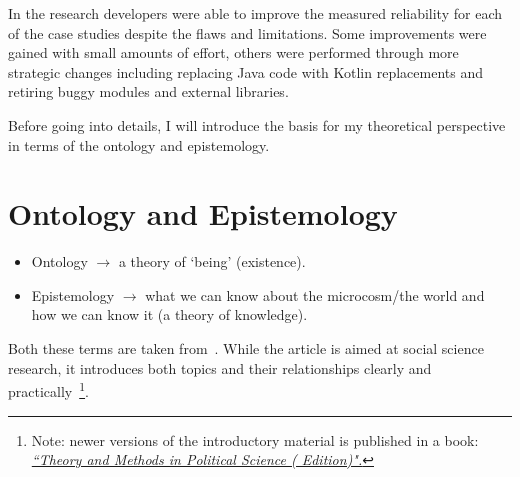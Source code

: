 In the research developers were able to improve the measured reliability for each of the case studies despite the flaws and limitations. Some improvements were gained with small amounts of effort, others were performed through more strategic changes including replacing Java code with Kotlin replacements and retiring buggy modules and external libraries.  

Before going into details, I will introduce the basis for my theoretical perspective in terms of the ontology and epistemology.

\section{Ontology and Epistemology}
\begin{itemize}
    \item Ontology \( \rightarrow \) a theory of `being' (existence).
    \item Epistemology \( \rightarrow \) what we can know about the microcosm/the world and how we can know it (a theory of knowledge).
\end{itemize}

Both these terms are taken from~\cite{marsh2002skin}. While the article is aimed at social science research, it introduces both topics and their relationships clearly and practically~\footnote{Note: newer versions of the introductory material is published in a book: \href{https://www.macmillanihe.com/page/detail/Theory-and-Methods-in-Political-Science/?K=9781137603517}{\emph{``Theory and Methods in Political Science ( Edition)".}}}.

